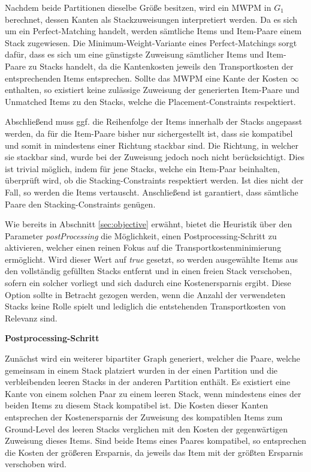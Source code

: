 Nachdem beide Partitionen dieselbe Größe besitzen, wird ein \textsc{MWPM} in $G_1$ berechnet, dessen Kanten als
Stackzuweisungen interpretiert werden. Da es sich um ein Perfect-Matching handelt, werden sämtliche Items und Item-Paare einem Stack zugewiesen. Die Minimum-Weight-Variante eines Perfect-Matchings sorgt dafür, dass es sich um eine günstigste Zuweisung sämtlicher Items und Item-Paare zu Stacks handelt, da die Kantenkosten jeweils den Transportkosten der entsprechenden Items entsprechen. Sollte das \textsc{MWPM} eine Kante der Kosten $\infty$ enthalten, so existiert keine zulässige Zuweisung der generierten Item-Paare und Unmatched Items zu den Stacks, welche die Placement-Constraints respektiert.

Abschließend muss ggf. die Reihenfolge der Items innerhalb der Stacks angepasst werden, da für die Item-Paare bisher nur sichergestellt ist,
dass sie kompatibel und somit in mindestens einer Richtung stackbar sind. Die Richtung, in welcher sie stackbar sind, wurde bei der Zuweisung
jedoch noch nicht berücksichtigt. Dies ist trivial möglich, indem für jene Stacks, welche ein Item-Paar beinhalten,
überprüft wird, ob die Stacking-Constraints respektiert werden. Ist dies nicht der Fall, so werden die Items vertauscht.
Anschließend ist garantiert, dass sämtliche Paare den Stacking-Constraints genügen.

\pagebreak

Wie bereits in Abschnitt \ref{sec:objective} erwähnt, bietet die Heuristik über den Parameter
\textit{postProcessing} die Möglichkeit, einen Postprocessing-Schritt zu aktivieren, welcher einen reinen Fokus
auf die Transportkostenminimierung ermöglicht. Wird dieser Wert auf \textit{true} gesetzt, so werden
ausgewählte Items aus den vollständig gefüllten Stacks entfernt und in einen freien
Stack verschoben, sofern ein solcher vorliegt und sich dadurch eine Kostenersparnis ergibt.
Diese Option sollte in Betracht gezogen werden, wenn die Anzahl der verwendeten Stacks keine Rolle spielt
und lediglich die entstehenden Transportkosten von Relevanz sind.

\textbf{Postprocessing-Schritt}

Zunächst wird ein weiterer bipartiter Graph generiert, welcher die Paare, welche gemeinsam in einem Stack
platziert wurden in der einen Partition und die verbleibenden leeren Stacks in der anderen Partition enthält.
Es existiert eine Kante von einem solchen Paar zu einem leeren Stack, wenn mindestens eines der beiden Items
zu diesem Stack kompatibel ist. Die Kosten dieser Kanten entsprechen der Kostenersparnis der Zuweisung des
kompatiblen Items zum Ground-Level des leeren Stacks verglichen mit den Kosten der gegenwärtigen Zuweisung dieses Items.
Sind beide Items eines Paares kompatibel, so entsprechen die Kosten der größeren Ersparnis, da jeweils das Item mit
der größten Ersparnis verschoben wird.

